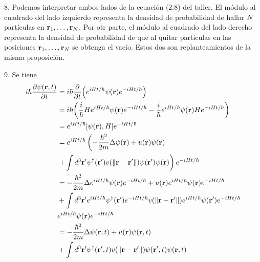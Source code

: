 \documentclass{article}
\begin{document}
8. Podemos interpretar ambos lados de la ecuación (2.8) del taller. El módulo al cuadrado del lado izquierdo representa la densidad de probabilidad de hallar $N$ partículas en $\vb{r}_1,\dots,\vb{r}_N$. Por otr parte, el módulo al cuadrado del lado derecho representa la densidad de probabilidad de que al quitar particulas en las posiciones $\vb{r}_1,\dots,\vb{r}_N$ se obtenga el vacío. Estos dos son replanteamientos de la misma proposición.

9. Se tiene
\begin{align}
\begin{split}
i\hbar\frac{\partial\psi(\vb{r},t)}{\partial t}&=i\hbar\frac{\partial}{\partial t}\qty(e^{iHt/\hbar}\psi(\vb{r})e^{-iHt/\hbar})\\
&=i\hbar\qty(\frac{i}{\hbar}He^{iHt/\hbar}\psi(\vb{r})e^{-iHt/\hbar}-\frac{i}{\hbar}e^{iHt/\hbar}\psi(\vb{r})He^{-iHt/\hbar})\\
&=e^{iHt/\hbar}[\psi(\vb{r}),H]e^{-iHt/\hbar}\\
&=e^{iHt/\hbar}\left(-\frac{\hbar^2}{2m}\Delta\psi(\vb{r})+u(\vb{r})\psi(\vb{r})\right.\\
&\left.+\int d^3\vb{r}'\psi^\dagger(\vb{r}')v(\|\vb{r}-\vb{r}'\|)\psi(\vb{r}')\psi(\vb{r})\right)e^{-iHt/\hbar}\\
&=-\frac{\hbar^2}{2m}\Delta e^{iHt/\hbar}\psi(\vb{r})e^{-iHt/\hbar}+u(\vb{r})e^{iHt/\hbar}\psi(\vb{r})e^{-iHt/\hbar}\\
&+\int d^3\vb{r}'e^{iHt/\hbar}\psi^\dagger(\vb{r}')e^{-iHt/\hbar}v(\|\vb{r}-\vb{r}'\|)e^{iHt/\hbar}\psi(\vb{r}')e^{-iHt/\hbar}\\
&e^{iHt/\hbar}\psi(\vb{r})e^{-iHt/\hbar}\\
&=-\frac{\hbar^2}{2m}\Delta\psi(\vb{r},t)+u(\vb{r})\psi(\vb{r},t)\\
&+\int d^3\vb{r}'\psi^\dagger(\vb{r}',t)v(\|\vb{r}-\vb{r}'\|)\psi(\vb{r}',t)\psi(\vb{r},t)
\end{split}
\end{align}
\end{document}
